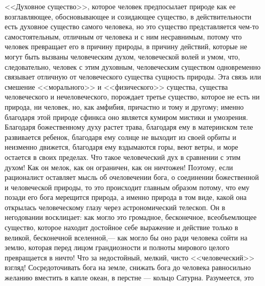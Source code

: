 \documentclass[12pt]{article}
\begin{document}
<<Духовное существо>>, которое человек предпосылает природе как ее возглавляющее, обосновывающее и созидающее существо, в действительности есть духовное существо самого человека, но это существо представляется чем-то самостоятельным, отличным от человека и с ним несравнимым, потому что человек превращает его в причину природы, в причину действий, которые не могут быть вызваны человеческим духом, человеческой волей и умом, что, следовательно, человек с этим духовным, человеческим существом одновременно связывает отличную от человеческого существа сущность природы. Эта связь или смешение <<морального>> и <<физического>> существа, существа человеческого и нечеловеческого, порождает третье существо, которое не есть ни природа, ни человек, но, как амфибия, причастно и тому и другому; именно благодаря этой природе сфинкса оно является кумиром мистики и умозрения. Благодаря божественному духу растет трава, благодаря ему в материнском теле развивается ребенок, благодаря ему солнце не выходит из своей орбиты и неизменно движется, благодаря ему вздымаются горы, веют ветры, и море остается в своих пределах. Что такое человеческий дух в сравнении с этим духом! Как он мелок, как он ограничен, как он ничтожен! Поэтому, если рационалист оставляет мысль об очеловечении бога, о соединении божественной и человеческой природы, то это происходит главным образом потому, что ему позади его бога мерещится природа, а именно природа в том виде, какой она открылась человеческому глазу через астрономический телескоп. Он в негодовании восклицает: как могло это громадное, бесконечное, всеобъемлющее существо, которое находит достойное себе выражение и действие только в великой, бесконечной вселенной,--- как могло бы оно ради человека сойти на землю, которая перед лицом грандиозности и полноты мирового целого превращается в ничто! Что за недостойный, мелкий, чисто <<человеческий>> взгляд! Сосредоточивать бога на земле, снижать бога до человека равносильно желанию вместить в капле океан, в перстне --- кольцо Сатурна. Разумеется, это
\end{document}

